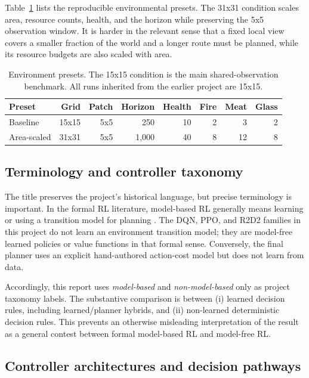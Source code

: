 \documentclass[10pt,letterpaper]{article}
\begin{document}
Table~\ref{tab:environments} lists the reproducible environmental presets. The 31x31 condition scales area, resource counts, health, and the horizon while preserving the 5x5 observation window. It is harder in the relevant sense that a fixed local view covers a smaller fraction of the world and a longer route must be planned, while its resource budgets are also scaled with area.

\begin{table}[H]
\caption{Environment presets. The 15x15 condition is the main shared-observation benchmark. All runs inherited from the earlier project are 15x15.}
\label{tab:environments}
\centering
\small
\begin{tabular}{lrrrrrrr}
\toprule
Preset & Grid & Patch & Horizon & Health & Fire & Meat & Glass \\
\midrule
Baseline & 15x15 & 5x5 & 250 & 10 & 2 & 3 & 2 \\
Area-scaled & 31x31 & 5x5 & 1,000 & 40 & 8 & 12 & 8 \\
\bottomrule
\end{tabular}
\end{table}

\subsection{Terminology and controller taxonomy}

The title preserves the project's historical language, but precise terminology is important. In the formal RL literature, model-based RL generally means learning or using a transition model for planning \citep{moerland2023survey}. The DQN, PPO, and R2D2 families in this project do not learn an environment transition model; they are model-free learned policies or value functions in that formal sense. Conversely, the final planner uses an explicit hand-authored action-cost model but does not learn from data.

Accordingly, this report uses \textit{model-based} and \textit{non-model-based} only as project taxonomy labels. The substantive comparison is between (i) learned decision rules, including learned/planner hybrids, and (ii) non-learned deterministic decision rules. This prevents an otherwise misleading interpretation of the result as a general contest between formal model-based RL and model-free RL.

\subsection{Controller architectures and decision pathways}
\end{document}
